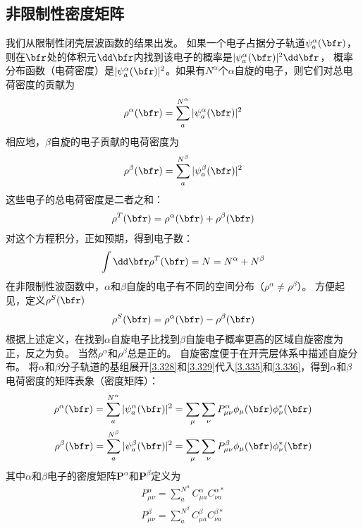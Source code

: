 \subsection{非限制性密度矩阵}
我们从限制性闭壳层波函数的结果出发。
如果一个电子占据分子轨道$\psi_a^\alpha(\bfr)$，则在$\bfr$处的体积元$\dd\bfr$内找到该电子的概率是$|\psi^\alpha_a(\bfr)|^2\dd\bfr$，
概率分布函数（电荷密度）是$|\psi^\alpha_a(\bfr)|^2$。如果有$N^\alpha$个$\alpha$自旋的电子，则它们对总电荷密度的贡献为
\begin{align}
	\label{3.335}
	\rho^\alpha(\bfr)=\sum^{N^\alpha}_a|\psi_a^\alpha(\bfr)|^2
\end{align}
相应地，$\beta$自旋的电子贡献的电荷密度为
\begin{align}
	\label{3.336}
	\rho^\beta(\bfr)=\sum^{N^\beta}_a|\psi_a^\beta(\bfr)|^2
\end{align}
这些电子的总电荷密度是二者之和：
\begin{align}
	\rho^T(\bfr)=\rho^\alpha(\bfr)+\rho^\beta(\bfr)
\end{align}
对这个方程积分，正如预期，得到电子数：
\begin{align}
	\int{\dd\bfr}\rho^T(\bfr)=N=N^\alpha+N^\beta
\end{align}
在非限制性波函数中，$\alpha$和$\beta$自旋的电子有不同的空间分布（$\rho^\alpha\neq\rho^\beta$）。
方便起见，定义$\rho^S(\bfr)$
\begin{align}
	\rho^S(\bfr)=\rho^\alpha(\bfr)-\rho^\beta(\bfr)
\end{align}
根据上述定义，在找到$\alpha$自旋电子比找到$\beta$自旋电子概率更高的区域自旋密度为正，反之为负。
当然$\rho^\alpha$和$\rho^\beta$总是正的。 
自旋密度便于在开壳层体系中描述自旋分布。
将$\alpha$和$\beta$分子轨道的基组展开\autoref{3.328}和\autoref{3.329}代入\autoref{3.335}和\autoref{3.336}，得到$\alpha$和$\beta$电荷密度的矩阵表象（密度矩阵）：
\begin{align}
	\rho^\alpha(\bfr)=\sum^{N^\alpha}_a|\psi^\alpha_a(\bfr)|^2=\sum_\mu\sum_\nu P^\alpha_{\mu\nu}\phi_\mu(\bfr)\phi_\nu^*(\bfr) \label{3.340}\\
	\rho^\beta(\bfr)=\sum^{N^\beta}_a|\psi^\beta_a(\bfr)|^2=\sum_\mu\sum_\nu P^\beta_{\mu\nu}\phi_\mu(\bfr)\phi_\nu^*(\bfr)
\end{align}
其中$\alpha$和$\beta$电子的密度矩阵$\mathbf{P}^\alpha$和$\mathbf{P}^\beta$定义为
\begin{align}
	P^\alpha_{\mu\nu}=\sum^{N^\alpha}_aC^\alpha_{\mu a}C^{\alpha*}_{\nu a} \\
	P^\beta_{\mu\nu}=\sum^{N^\beta}_aC^\beta_{\mu a}C^{\beta*}_{\nu a} \label{3.343}
\end{align}

